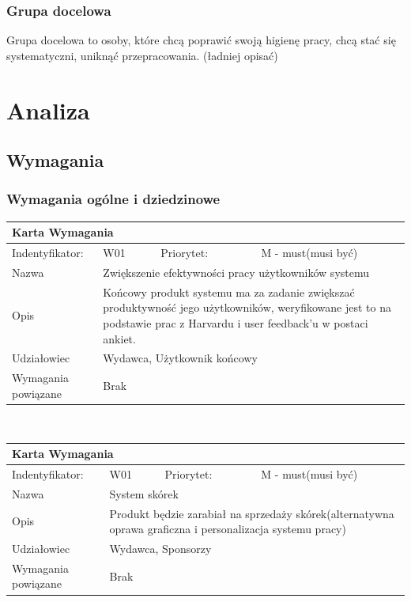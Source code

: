 \documentclass[a4paper,11pt]{report}
\begin{document}
\subsection {Grupa docelowa}
Grupa docelowa to osoby, które chcą poprawić swoją higienę pracy, chcą stać się systematyczni, uniknąć przepracowania. (ładniej opisać)
\chapter {Analiza}

\section {Wymagania}
\subsection {Wymagania ogólne i dziedzinowe}
		\begin{tabular}{|p{3cm}|p{2cm}|p{2cm}|p{6cm}|}
		\hline
		\multicolumn{4}{|p{12 cm}|}{Karta Wymagania}\\
		\hline
		Indentyfikator: & W01 & Priorytet: & M - must(musi być)\\
		\hline
		Nazwa & \multicolumn{3}{|p{10 cm}|}{Zwiększenie efektywności pracy użytkowników systemu}\\
		\hline
		Opis & \multicolumn{3}{|p{10 cm}|}{Końcowy produkt systemu ma za zadanie zwiększać produktywność jego użytkowników, weryfikowane jest to na podstawie prac z Harvardu i user feedback’u w postaci ankiet. }\\
		\hline
		Udziałowiec & \multicolumn{3}{|p{10 cm}|}{Wydawca, Użytkownik końcowy}\\
		\hline
		Wymagania powiązane & \multicolumn{3}{|p{10 cm}|}{Brak}\\
		\hline
		\end{tabular}\\
		\begin{tabular}{|p{3cm}|p{2cm}|p{2cm}|p{6cm}|}
		\hline
		\multicolumn{4}{|p{12 cm}|}{Karta Wymagania}\\
		\hline
		Indentyfikator: & W01 & Priorytet: & M - must(musi być)\\
		\hline
		Nazwa & \multicolumn{3}{|p{10 cm}|}{System skórek}\\
		\hline
		Opis & \multicolumn{3}{|p{10 cm}|}{Produkt będzie zarabiał na sprzedaży skórek(alternatywna oprawa graficzna i personalizacja systemu pracy)}\\
		\hline
		Udziałowiec & \multicolumn{3}{|p{10 cm}|}{Wydawca, Sponsorzy}\\
		\hline
		Wymagania powiązane & \multicolumn{3}{|p{10 cm}|}{Brak}\\
		\hline
		\end{tabular}\\
\end{document}
